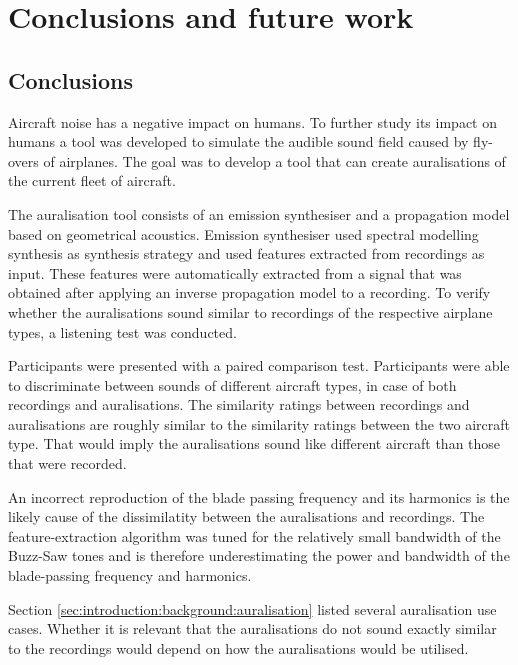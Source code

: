 \chapter{Conclusions and future work}\label{chapter:conclusions}

\section{Conclusions}


Aircraft noise has a negative impact on humans. To further study its impact on
humans a tool was developed to simulate the audible sound field caused by
fly-overs of airplanes. The goal was to develop a tool that can create
auralisations of the current fleet of aircraft.

The auralisation tool consists of an emission synthesiser and a propagation
model based on geometrical acoustics. Emission synthesiser used spectral
modelling synthesis as synthesis strategy and used features extracted from
recordings as input. These features were automatically extracted from a signal
that was obtained after applying an inverse propagation model to a recording.
To verify whether the auralisations sound similar to recordings of the
respective airplane types, a listening test was conducted.

Participants were presented with a paired comparison test. Participants were
able to discriminate between sounds of different aircraft types, in case of both
recordings and auralisations. The similarity ratings between recordings and
auralisations are roughly similar to the similarity ratings between the two
aircraft type. That would imply the auralisations sound like different aircraft
than those that were recorded.

An incorrect reproduction of the blade passing frequency and its harmonics is
the likely cause of the dissimilatity between the auralisations and recordings.
The feature-extraction algorithm was tuned for the relatively small bandwidth of
the Buzz-Saw tones and is therefore underestimating the power and bandwidth of
the blade-passing frequency and harmonics.

Section \ref{sec:introduction:background:auralisation} listed several
auralisation use cases. Whether it is relevant that the auralisations do not
sound exactly similar to the recordings would depend on how the auralisations
would be utilised.

